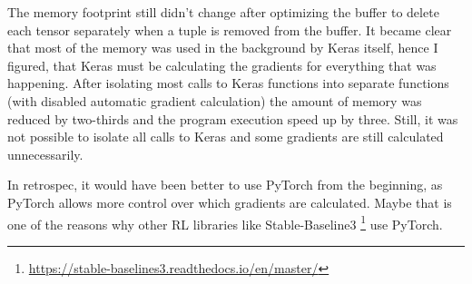 \documentclass[a4paper,12pt,
headsepline,           %
oneside,               %
bibtotoc,              %
]{scrbook}
\newcommand{\fullname}{Tim Wibiral}
\newcommand{\matnr}{\censor{1234567}}
\begin{document}
The memory footprint still didn't change after optimizing the buffer to delete each tensor separately when a tuple is removed from the buffer. It became clear that most of the memory was used in the background by Keras itself, hence I figured, that Keras must be calculating the gradients for everything that was happening. After isolating most calls to Keras functions into separate functions (with disabled automatic gradient calculation) the amount of memory was reduced by two-thirds and the program execution speed up by three. Still, it was not possible to isolate all calls to Keras and some gradients are still calculated unnecessarily.

In retrospec, it would have been better to use PyTorch from the beginning, as PyTorch allows more control over which gradients are calculated. Maybe that is one of the reasons why other RL libraries like Stable-Baseline3%
\footnote{\url{https://stable-baselines3.readthedocs.io/en/master/}} %
use PyTorch.



\cleardoublepage
\backmatter

\clearpage
\printbibliography






\end{document}
